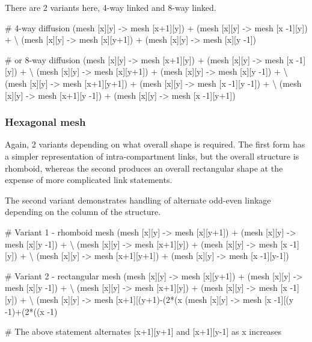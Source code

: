 There are 2 variants here, 4-way linked and 8-way linked.

\begin{kappasource}

# 4-way diffusion
    (mesh [x][y] -> mesh [x+1][y]) + (mesh [x][y] -> mesh [x -1][y]) + {\textbackslash}
    (mesh [x][y] -> mesh [x][y+1]) + (mesh [x][y] -> mesh [x][y -1])

# or 8-way diffusion
    (mesh [x][y] -> mesh [x+1][y]) + (mesh [x][y] -> mesh [x -1][y]) + {\textbackslash}
    (mesh [x][y] -> mesh [x][y+1]) + (mesh [x][y] -> mesh [x][y -1]) + {\textbackslash}
    (mesh [x][y] -> mesh [x+1][y+1]) + (mesh [x][y] -> mesh [x -1][y -1]) + {\textbackslash}
    (mesh [x][y] -> mesh [x+1][y -1]) + (mesh [x][y] -> mesh [x -1][y+1])
\end{kappasource}

\subsubsection{Hexagonal mesh}

Again, 2 variants depending on what overall shape is required. The first form has a simpler representation of intra-compartment links, but the overall structure is rhomboid, whereas the second produces an overall rectangular shape at the expense of more complicated link statements.

The second variant demonstrates handling of alternate odd-even linkage depending on the column of the structure.

\begin{kappasource}

# Variant 1 - rhomboid mesh
    (mesh [x][y] -> mesh [x][y+1]) + (mesh [x][y] -> mesh [x][y -1]) + {\textbackslash}
    (mesh [x][y] -> mesh [x+1][y]) + (mesh [x][y] -> mesh [x -1][y]) + {\textbackslash}
    (mesh [x][y] -> mesh [x+1][y+1]) + (mesh [x][y] -> mesh [x -1][y-1])

# Variant 2 - rectangular mesh
    (mesh [x][y] -> mesh [x][y+1]) + (mesh [x][y] -> mesh [x][y -1]) + {\textbackslash}
    (mesh [x][y] -> mesh [x+1][y]) + (mesh [x][y] -> mesh [x -1][y]) + {\textbackslash}
    (mesh [x][y] -> mesh [x+1][(y+1)-(2*(x%
    (mesh [x][y] -> mesh [x -1][(y -1)+(2*((x -1)%

# The above statement alternates [x+1][y+1] and [x+1][y-1] as x increases
\end{kappasource}


